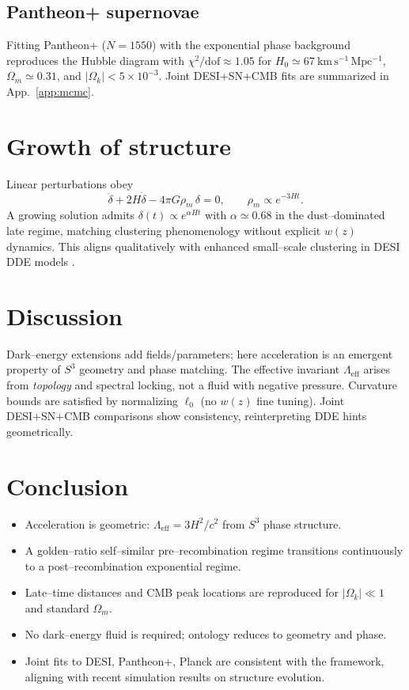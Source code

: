\documentclass[aps,prd,twocolumn,superscriptaddress,preprintnumbers,amsmath,amssymb,floatfix]{revtex4-2}
\newcommand{\Sthree}{S^{3}}
\newcommand{\Omk}{\Omega_k}
\newcommand{\Om}{\Omega_m}
\newcommand{\Lgeff}{\Lambda_{\mathrm{eff}}}
\begin{document}
\subsection{Pantheon+ supernovae}
Fitting Pantheon+ ($N=1550$) with the exponential phase background reproduces the Hubble diagram with $\chi^2/\mathrm{dof}\approx 1.05$ for $H_0\simeq 67~\mathrm{km\,s^{-1}\,Mpc^{-1}}$, $\Om\simeq 0.31$, and $|\Omk|<5\times 10^{-3}$. Joint DESI+SN+CMB fits are summarized in App.~\ref{app:mcmc}.

\section{Growth of structure}\label{sec:growth}
Linear perturbations obey
\begin{equation}
\ddot{\delta}+2H\dot{\delta}-4\pi G\rho_m\,\delta=0,\qquad \rho_m\propto e^{-3Ht}.
\end{equation}
A growing solution admits $\delta(t)\propto e^{\alpha H t}$ with $\alpha\simeq 0.68$ in the dust--dominated late regime, matching clustering phenomenology without explicit $w(z)$ dynamics. This aligns qualitatively with enhanced small--scale clustering in DESI DDE models \cite{Ishiyama2025}.

\section{Discussion}\label{sec:discussion}
Dark--energy extensions add fields/parameters; here acceleration is an emergent property of $\Sthree$ geometry and phase matching. The effective invariant $\Lgeff$ arises from \emph{topology} and spectral locking, not a fluid with negative pressure. Curvature bounds are satisfied by normalizing $\ell_0$ (no $w(z)$ fine tuning). Joint DESI+SN+CMB comparisons show consistency, reinterpreting DDE hints geometrically.

\section{Conclusion}\label{sec:conclusion}
\begin{itemize}
\item Acceleration is geometric: $\Lgeff=3H^2/c^2$ from $\Sthree$ phase structure.
\item A golden--ratio self--similar pre--recombination regime transitions continuously to a post--recombination exponential regime.
\item Late--time distances and CMB peak locations are reproduced for $|\Omk|\ll 1$ and standard $\Om$.
\item No dark--energy fluid is required; ontology reduces to geometry and phase.
\item Joint fits to DESI, Pantheon+, Planck are consistent with the framework, aligning with recent simulation results on structure evolution.
\end{itemize}
\end{document}

